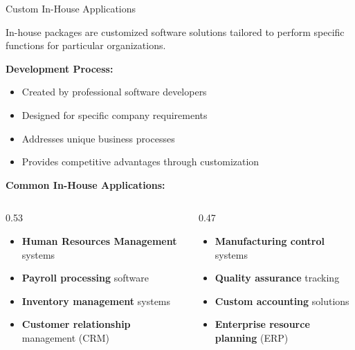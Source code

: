 \documentclass[aspectratio=169]{beamer}
\begin{document}
\begin{frame}{Custom In-House Applications}
    \begin{definition}
        In-house packages are customized software solutions tailored to perform specific functions for particular organizations.
    \end{definition}
    
    \vspace{0.3cm}
    \textbf{Development Process:}
    \begin{itemize}
        \item Created by professional software developers
        \item Designed for specific company requirements
        \item Addresses unique business processes
        \item Provides competitive advantages through customization
    \end{itemize} 
    \textbf{Common In-House Applications:}
    \begin{columns}
        \begin{column}{0.53\textwidth}
            \begin{itemize}
                \item \textbf{Human Resources Management} systems
                \item \textbf{Payroll processing} software
                \item \textbf{Inventory management} systems
                \item \textbf{Customer relationship} management (CRM)
            \end{itemize}
        \end{column}
        \begin{column}{0.47\textwidth}
            \begin{itemize}
                \item \textbf{Manufacturing control} systems
                \item \textbf{Quality assurance} tracking
                \item \textbf{Custom accounting} solutions
                \item \textbf{Enterprise resource planning} (ERP)
            \end{itemize}
        \end{column}
    \end{columns}
    
  
\end{frame}
\end{document}

